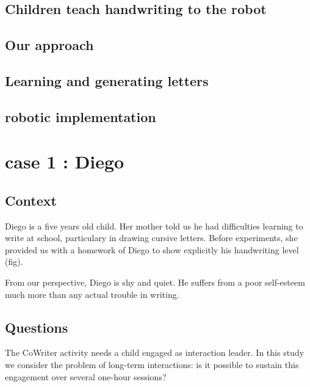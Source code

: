 \documentclass{sig-alternate}
\begin{document}
\subsection{Children teach handwriting to the robot}
\subsection{Our approach}

\subsection{Learning and generating letters}

\subsection{robotic implementation}

\section{case 1 : Diego}
\subsection{Context}
Diego is a five years old child. Her mother told us he had difficulties learning
to write at school, particulary in drawing cursive letters. Before experiments,
she provided us with a homework of Diego to show explicitly his handwriting
level (fig). 

From our perspective, Diego is shy and quiet. He suffers from a poor
self-esteem much more than any actual trouble in writing.

\subsection{Questions}

The CoWriter activity needs a child engaged as interaction leader. 
In this study we consider the problem of long-term interactions: is it possible to
sustain this engagement over several one-hour sessions?

\end{document}
